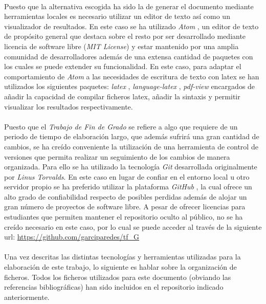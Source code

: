 \documentclass{subfiles}
\begin{document}
    \paragraph{}
    Puesto que la alternativa escogida ha sido la de generar el documento mediante herramientas locales es necesario utilizar un editor de texto así como un visualizador de resultados. En este caso se ha utilizado \emph{Atom} \cite{tool:atom}, un editor de texto de propósito general que destaca sobre el resto por ser desarrollado mediante licencia de software libre (\emph{MIT License}) y estar mantenido por una amplia comunidad de desarrolladores además de una extensa cantidad de paquetes con los cuales se puede extender su funcionalidad. En este caso, para adaptar el comportamiento de \emph{Atom} a las necesidades de escritura de texto con latex se han utilizados los siguientes paquetes: \emph{latex} \cite{tool:atom-latex}, \emph{language-latex} \cite{tool:atom-language-latex}, \emph{pdf-view} \cite{tool:atom-pdf-view} encargados de añadir la capacidad de compilar ficheros latex, añadir la sintaxis y permitir visualizar los resultados respectivamente.

    \paragraph{}
    Puesto que el \emph{Trabajo de Fin de Grado} se refiere a algo que requiere de un periodo de tiempo de elaboración largo, que además sufrirá una gran cantidad de cambios, se ha creído conveniente la utilización de una herramienta de control de versiones que permita realizar un seguimiento de los cambios de manera organizada. Para ello se ha utilizado la tecnología \emph{Git} \cite{tool:git} desarrollada originalmente por \emph{Linus Torvalds}. En este caso en lugar de confiar en el entorno local u otro servidor propio se ha preferido utilizar la plataforma \emph{GitHub} \cite{tool:github}, la cual ofrece un alto grado de confiabilidad respecto de posibles perdidas además de alojar un gran número de proyectos de software libre. A pesar de ofrecer licencias para estudiantes que permiten mantener el repositorio oculto al público, no se ha creído necesario en este caso, por lo cual se puede acceder al través de la siguiente url: \url{https://github.com/garciparedes/tf_G}

    \paragraph{}
    Una vez descritas las distintas tecnologías y herramientas utilizadas para la elaboración de este trabajo, lo siguiente es hablar sobre la organización de ficheros. Todos los ficheros utilizados para este documento (obviando las referencias bibliográficas) han sido incluidos en el repositorio indicado anteriormente.
\end{document}
